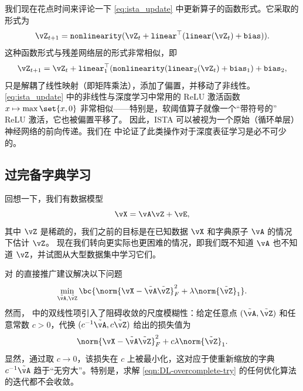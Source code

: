 \documentclass[../../book-main_zh.tex]{subfiles}
\begin{document}
我们现在花点时间来评论一下 \eqref{eq:ista_update} 中更新算子的函数形式。它采取的形式为
\begin{equation}
    \vZ_{t + 1} = \texttt{nonlinearity}(\vZ_{t} +
    \texttt{linear}^{\top}(\texttt{linear}(\vZ_{t}) + \texttt{bias})).
\end{equation}
这种函数形式与残差网络层的形式非常相似，即
\begin{equation}
    \vZ_{t + 1} = \vZ_{t} +
    \texttt{linear}_{1}^{\top}(\texttt{nonlinearity}(\texttt{linear}_{2}(\vZ_{t})
        + \texttt{bias}_{1}) + \texttt{bias}_{2},
    \end{equation}
    只是解耦了线性映射（即矩阵乘法），添加了偏置，并移动了非线性。
    \eqref{eq:ista_update} 中的非线性与深度学习中常用的 ReLU 激活函数 $x \mapsto
    \max\set{x, 0}$ 非常相似——特别是，软阈值算子就像一个“带符号的” ReLU 激活，它也被偏置平移了。
    因此，ISTA 可以被视为一个原始（循环单层）神经网络的前向传递。我们在 
    中论证了此类操作对于深度表征学习是必不可少的。

    \subsection{过完备字典学习}

    回想一下，我们有数据模型
    \begin{equation}\label{eq:overcomplete-dl-section-data-model}
        \vX = \vA\vZ + \vE,
    \end{equation}
    其中 \(\vZ\) 是稀疏的，我们之前的目标是在已知数据 \(\vX\) 和字典原子 \(\vA\) 的情况下估计 \(\vZ\)。
    现在我们转向更实际也更困难的情况，即我们既不知道 \(\vA\) 也不知道 \(\vZ\)，并试图从大型数据集中学习它们。

    对  的直接推广建议解决以下问题
    \begin{equation}
        \min_{\tilde{\vA}, \tilde{\vZ}}\bc{\norm{\vX -
        \tilde{\vA}\tilde{\vZ}}_{F}^{2} + \lambda \norm{\tilde{\vZ}}_{1}}.
        \label{eqn:DL-overcomplete-try}
    \end{equation}
    然而， 中的双线性项引入了阻碍收敛的尺度模糊性：给定任意点 $(\tilde{\vA},
    \tilde{\vZ})$ 和任意常数 $c>0$，代换 $(c^{-1}\tilde{\vA}, c\tilde{\vZ})$ 给出的损失值为
    \begin{equation}
        \norm{\vX - \tilde{\vA}\tilde{\vZ}}_{F}^{2} + c\lambda
        \norm{\tilde{\vZ}}_{1}.
    \end{equation}
    显然，通过取 $c \to 0$，该损失在 $c$ 上被最小化，这对应于使重新缩放的字典 $c^{-1} \tilde{\vA}$
    趋于“无穷大”。特别是，求解 \eqref{eqn:DL-overcomplete-try} 的任何优化算法的迭代都不会收敛。
\end{document}
